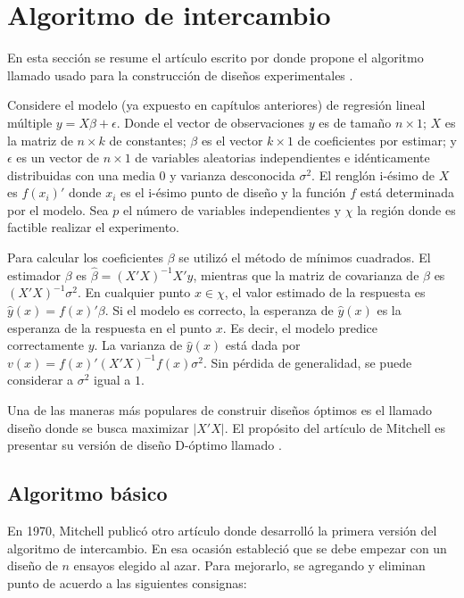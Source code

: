 \section{Algoritmo de intercambio}
En esta sección se resume el artículo escrito por \cite{mitchelldetmax} donde propone el algoritmo llamado  usado para la construcción de diseños experimentales . 

Considere el modelo (ya expuesto en capítulos anteriores) de regresión lineal múltiple $y = X \beta + \epsilon$. Donde el vector de observaciones $y$ es de tamaño $n \times 1$; $X$ es la matriz de $n \times k$ de constantes; $\beta$ es el vector $k \times 1$ de coeficientes por estimar; y $\epsilon$ es un vector de $n \times 1$ de variables aleatorias independientes e idénticamente distribuidas con una media $0$ y varianza desconocida $\sigma^{2}$. El renglón i-ésimo de $X$ es $f(x_i)'$ donde $x_i$ es el i-ésimo punto de diseño y la función $f$ está determinada por el modelo. Sea $p$ el número de variables independientes y $\chi$ la región donde es factible realizar el experimento.

Para calcular los coeficientes $\beta$ se utilizó el método de mínimos cuadrados. El estimador $\beta$ es $\hat{\beta} = (X'X)^{-1} X'y$, mientras que la matriz de covarianza de $\hat{\beta}$ es $(X'X)^{-1} \sigma^{2}$. En cualquier punto $x \in \chi$, el valor estimado de la  respuesta es $\hat{y} (x) = f(x)' \beta$. Si el modelo es correcto, la esperanza de $\hat{y}(x)$ es la esperanza de la respuesta en el punto $x$. Es decir, el modelo predice correctamente $y$. La varianza de $\hat{y}(x)$ está dada por $v(x) = f(x)' (X'X)^{-1} f(x) \sigma^{2}$. Sin pérdida de generalidad, se puede considerar a $\sigma^{2}$ igual a $1$. 

Una de las maneras más populares de construir diseños óptimos es el llamado diseño  donde se busca maximizar $|X'X|$. El propósito del artículo de Mitchell es presentar su versión de diseño D-óptimo llamado . 

\subsection{Algoritmo básico}

En 1970, Mitchell publicó otro artículo donde desarrolló la primera versión del algoritmo de intercambio. En esa ocasión estableció que se debe empezar con un diseño de $n$ ensayos elegido al azar. Para mejorarlo, se agregando y eliminan punto de acuerdo a las siguientes consignas: 

